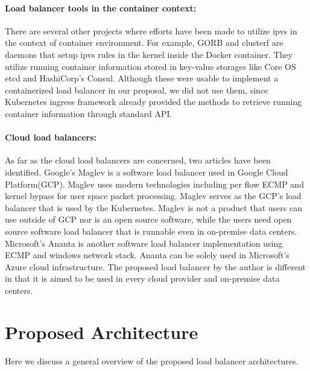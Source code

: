 \paragraph{\bf Load balancer tools in the container context:}
There are several other projects where efforts have been made to utilize ipvs in the context of container environment.
For example, GORB\cite{Sibiryov2015} and clusterf\cite{Aaltodoc:http://urn.fi/URN:NBN:fi:aalto-201611025433} are daemons 
that setup ipvs rules in the kernel inside the Docker container. 
They utilize running container information stored in key-value storages
like Core OS etcd\cite{CoreOSEtcd} and HashiCorp's Consul\cite{HashiCorpConsul}. 
Although these were usable to implement a containerized load balancer in our proposal, we did not use them, 
since Kubernetes ingress framework already provided the methods to retrieve running container information through standard API.

\paragraph{\bf Cloud load balancers:}

As far as the cloud load balancers are concerned, two articles have been identified.
Google's Maglev\cite{eisenbud2016maglev} is a software load balancer used in Google Cloud Platform(GCP).
Maglev uses modern technologies including per flow ECMP and kernel bypass for user space packet processing.
Maglev serves as the GCP's load balancer that is used by the Kubernetes.
Maglev is not a product that users can use outside of GCP nor is an open source software, while the users need open source software load balancer that is runnable even in on-premise data centers.
Microsoft's Ananta\cite{patel2013ananta} is another software load balancer implementation using ECMP and windows network stack.
Ananta can be solely used in Microsoft's Azure cloud infrastructure\cite{patel2013ananta}.
The proposed load balancer by the author is different in that it is aimed to be used in every cloud provider and on-premise data centers.

\section{Proposed Architecture}\label{Proposed Architecture}

Here we discuss a general overview of the proposed load balancer architectures.


